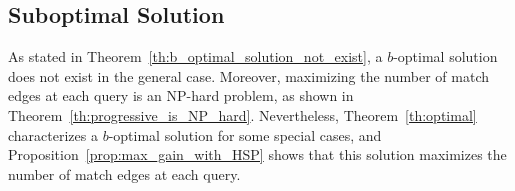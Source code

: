 \documentclass[sigconf, nonacm]{acmart}
\newcommand{\window}{b}
\begin{document}

\subsection{Suboptimal Solution}\label{sub:suboptimal_solution}

As stated in Theorem~\ref{th:b_optimal_solution_not_exist}, a $b$-optimal solution does not exist in the general case. Moreover, maximizing the number of match edges at each query is an NP-hard problem, as shown in Theorem~\ref{th:progressive_is_NP_hard}. Nevertheless, Theorem~\ref{th:optimal} characterizes a $b$-optimal solution for some special cases, and Proposition~\ref{prop:max_gain_with_HSP} shows that this solution maximizes the number of match edges at each query. 
\end{document}
